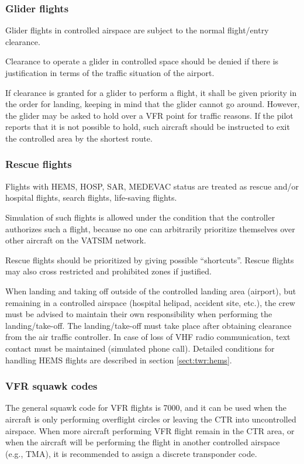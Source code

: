 \subsubsection{Glider flights}
Glider flights in controlled airspace are subject to the normal flight/entry clearance.

Clearance to operate a glider in controlled space should be denied if there is justification in terms of the traffic situation of the airport.

If clearance is granted for a glider to perform a flight, it shall be given priority in the order for landing, keeping in mind that the glider cannot go around. However, the glider may be asked to hold over a VFR point for traffic reasons. If the pilot reports that it is not possible to hold, such aircraft should be instructed to exit the controlled area by the shortest route.

\subsubsection{Rescue flights}

Flights with HEMS, HOSP, SAR, MEDEVAC status are treated as rescue and/or hospital flights, search flights, life-saving flights.

Simulation of such flights is allowed under the condition that the controller authorizes such a flight, because no one can arbitrarily prioritize themselves over other aircraft on the VATSIM network.

Rescue flights should be prioritized by giving possible ``shortcuts''. Rescue flights may also cross restricted and prohibited zones if justified.

When landing and taking off outside of the controlled landing area (airport), but remaining in a controlled airspace (hospital helipad, accident site, etc.), the crew must be advised to maintain their own responsibility when performing the landing/take-off. The landing/take-off must take place after obtaining clearance from the air traffic controller. 
In case of loss of VHF radio communication, text contact must be maintained (simulated phone call).
Detailed conditions for handling HEMS flights are described in section \ref{sect:twr:hems}.

\subsubsection{VFR squawk codes}
The general squawk code for VFR flights is 7000, and it can be used when the aircraft is only performing overflight circles or leaving the CTR into uncontrolled airspace. When more aircraft performing VFR flight remain in the CTR area, or when the aircraft will be performing the flight in another controlled airspace (e.g., TMA), it is recommended to assign a discrete transponder code.

